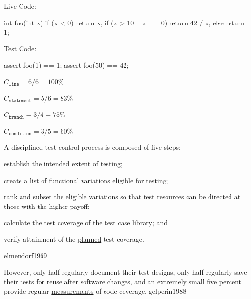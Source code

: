 \documentclass{article}
\begin{document}
\begin{multicols}{2}
Live Code:\par
{\small\begin{ffcode}
int foo(int x) {
  if (x < 0) { return x; }
  if (x > 10 || x == 0) {
    return 42 / x;
  } else {
    return 1;
  }
}
\end{ffcode}
}
\par\columnbreak\par
Test Code:\par
{\small\begin{ffcode}
assert foo(1) == 1;
assert foo(50) == 42;
\end{ffcode}
}
\( C_{\texttt{line}} = 6/6 = 100\% \)\par
\( C_{\texttt{statement}} = 5/6 = 83\% \)\par
\( C_{\texttt{branch}} = 3/4 = 75\% \)\par
\( C_{\texttt{condition}} = 3/5 = 60\% \)\par
\end{multicols}
\plush{}

  {A disciplined test control process is composed of five steps:
  \begin{inparaenum}[1)]
    \item establish the intended extent of testing;
    \item create a list of functional \ul{variations} eligible for testing;
    \item rank and subset the \ul{eligible} variations so that test resources can be directed at those with the higher payoff;
    \item calculate the \ul{test coverage} of the test case library; and
    \item verify attainment of the \ul{planned} test coverage.
  \end{inparaenum}}
  {elmendorf1969}

  {However, only half regularly document their test designs, only half regularly save their tests for reuse after software changes, and an extremely small five percent provide regular \ul{measurements} of code coverage.}
  {gelperin1988}
\end{document}
